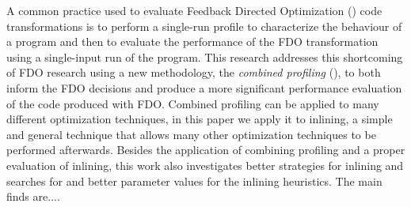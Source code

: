 
A common practice used to evaluate Feedback Directed Optimization
(\FDO) code transformations is to perform a single-run profile to characterize the behaviour of a program and then to evaluate the performance
of the FDO transformation using  a single-input run of the program. This research addresses this shortcoming of FDO research using a new methodology, the {\em combined profiling} (\CP), to both inform the FDO decisions and produce a more significant performance evaluation of the code produced with FDO. Combined profiling can be applied to many different
optimization techniques, in this paper  we apply it to inlining, a simple and general technique
that allows many other optimization techniques to be performed afterwards. Besides the application of combining profiling and a proper evaluation of inlining, this work also investigates better strategies for inlining and searches for and
better parameter values for the inlining heuristics. The main finds are....


